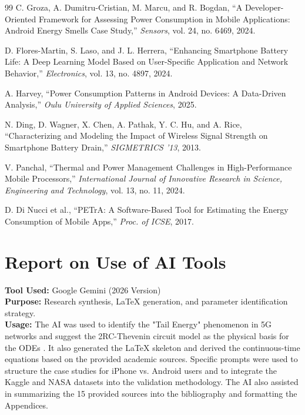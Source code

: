 \documentclass[12pt]{article}
\begin{document}
\begin{thebibliography}{99}
C. Groza, A. Dumitru-Cristian, M. Marcu, and R. Bogdan, ``A Developer-Oriented Framework for Assessing Power Consumption in Mobile Applications: Android Energy Smells Case Study,'' \textit{Sensors}, vol. 24, no. 6469, 2024.

D. Flores-Martin, S. Laso, and J. L. Herrera, ``Enhancing Smartphone Battery Life: A Deep Learning Model Based on User-Specific Application and Network Behavior,'' \textit{Electronics}, vol. 13, no. 4897, 2024.

A. Harvey, ``Power Consumption Patterns in Android Devices: A Data-Driven Analysis,'' \textit{Oulu University of Applied Sciences}, 2025.

N. Ding, D. Wagner, X. Chen, A. Pathak, Y. C. Hu, and A. Rice, ``Characterizing and Modeling the Impact of Wireless Signal Strength on Smartphone Battery Drain,'' \textit{SIGMETRICS '13}, 2013.

V. Panchal, ``Thermal and Power Management Challenges in High-Performance Mobile Processors,'' \textit{International Journal of Innovative Research in Science, Engineering and Technology}, vol. 13, no. 11, 2024.

D. Di Nucci et al., ``PETrA: A Software-Based Tool for Estimating the Energy Consumption of Mobile Apps,'' \textit{Proc. of ICSE}, 2017.

\end{thebibliography}

\newpage
\section*{Report on Use of AI Tools}
\textbf{Tool Used:} Google Gemini (2026 Version) \\
\textbf{Purpose:} Research synthesis, LaTeX generation, and parameter identification strategy. \\
\textbf{Usage:} The AI was used to identify the "Tail Energy" phenomenon in 5G networks \cite{13} and suggest the 2RC-Thevenin circuit model as the physical basis for the ODEs \cite{6}. It also generated the LaTeX skeleton and derived the continuous-time equations based on the provided academic sources. Specific prompts were used to structure the case studies for iPhone vs. Android users and to integrate the Kaggle and NASA datasets into the validation methodology. The AI also assisted in summarizing the 15 provided sources into the bibliography and formatting the Appendices.
\end{document}
